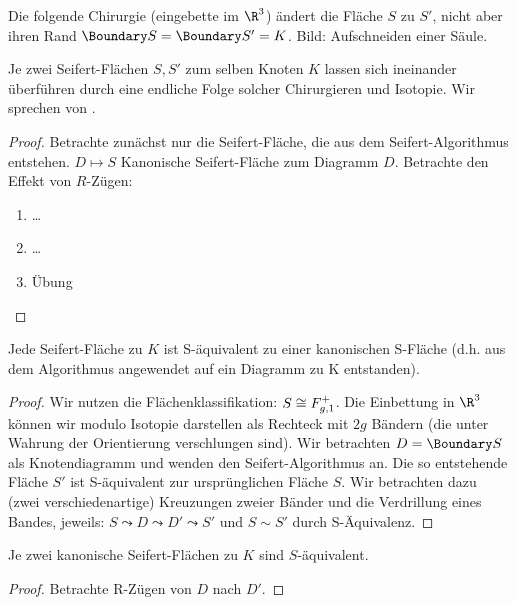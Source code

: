 Die folgende Chirurgie (eingebette im $\R^3$) ändert die Fläche $S$ zu $S'$, nicht aber ihren Rand $\Boundary S = \Boundary S' = K$.
Bild: Aufschneiden einer Säule.

\begin{st}
    Je zwei Seifert-Flächen $S, S'$ zum selben Knoten $K$ lassen sich ineinander überführen durch eine endliche Folge solcher Chirurgieren und Isotopie.
    Wir sprechen von .
    \begin{proof}
        Betrachte zunächst nur die Seifert-Fläche, die aus dem Seifert-Algorithmus entstehen.
        $D \mapsto S$ Kanonische Seifert-Fläche zum Diagramm $D$.
        Betrachte den Effekt von $R$-Zügen:
        \begin{enumerate}[R1]
            \item
                …
            \item
                …
            \item
                Übung
        \end{enumerate}
    \end{proof}
\end{st}


\begin{lem}
    Jede Seifert-Fläche zu $K$ ist S-äquivalent zu einer kanonischen S-Fläche (d.h. aus dem Algorithmus angewendet auf ein Diagramm zu K entstanden).
    \begin{proof}
        Wir nutzen die Flächenklassifikation: $S \cong F_{g,1}^+$.
        Die Einbettung in $\R^3$ können wir modulo Isotopie darstellen als Rechteck mit $2g$ Bändern (die unter Wahrung der Orientierung verschlungen sind).
        Wir betrachten $D = \Boundary S$ als Knotendiagramm und wenden den Seifert-Algorithmus an.
        Die so entstehende Fläche $S'$ ist S-äquivalent zur ursprünglichen Fläche $S$.
        Wir betrachten dazu (zwei verschiedenartige) Kreuzungen zweier Bänder und die Verdrillung eines Bandes, jeweils: $S \leadsto D \leadsto D' \leadsto S'$ und $S \sim S'$ durch S-Äquivalenz.
    \end{proof}
\end{lem}

\begin{lem}
    Je zwei kanonische Seifert-Flächen zu $K$ sind $S$-äquivalent.
    \begin{proof}
        Betrachte R-Zügen von $D$ nach $D'$.
    \end{proof}
\end{lem}


